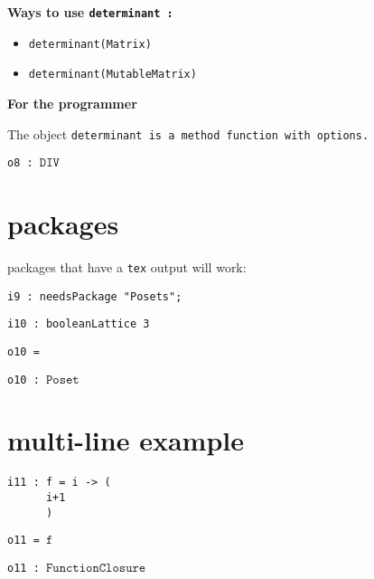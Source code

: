 \documentclass[12pt,a4paper]{amsart}
\begin{document}
\par \medskip\noindent\begingroup\Large\bf
Ways to use \begingroup\tt determinant\endgroup{} :\endgroup
\par \smallskip%
\begin{itemize}
\item \begingroup\tt {}determinant(Matrix){}\endgroup{}
\item \begingroup\tt {}determinant(MutableMatrix){}\endgroup{}
\end{itemize}

\par \medskip\noindent\begingroup\Large\bf
For the programmer\endgroup
\par \smallskip%

\par The object \begingroup\tt determinant\endgroup{} is a \begingroup\tt method\ function\ with\ options\endgroup{}.

\noindent\verb|o8 : |$\texttt{DIV}$


\section{packages}
packages that have a {\tt tex} output will work:
\begin{verbatim}
i9 : needsPackage "Posets";
\end{verbatim}
\begin{verbatim}
i10 : booleanLattice 3
\end{verbatim}
\noindent\verb|o10 = |


\noindent\verb|o10 : |$\texttt{Poset}$


\section{multi-line example}
\begin{verbatim}
i11 : f = i -> (
      i+1
      )
\end{verbatim}
\noindent\verb|o11 = |$\texttt{f}$

\noindent\verb|o11 : |$\texttt{FunctionClosure}$
\end{document}
